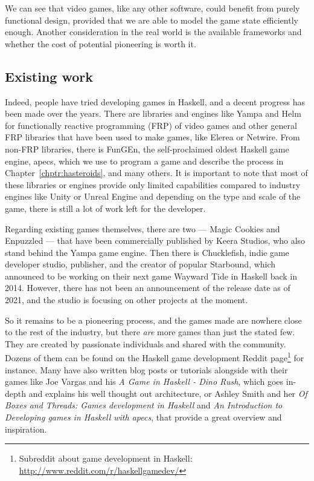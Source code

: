 \documentclass[
  digital, %
  color,   %
  table,   %
  oneside, %
  lof,     %
  lot,     %
]{fithesis3}
\begin{document}
We can see that video games, like any other software, could benefit from
purely functional design, provided that we are able to model the
game state efficiently enough. Another consideration in the real world
is the available frameworks and whether the cost of potential
pioneering is worth it.


\subsection{Existing work}
\label{sect:existing}
Indeed, people have tried developing games in Haskell, and a decent
progress has been made over the years. There are libraries and engines like Yampa\cite{yamparepo}
and Helm\cite{helmrepo} for functionally reactive programming (FRP) of video games and
other general FRP libraries that have been used to make games, like Elerea\cite{elerearepo}
or Netwire\cite{netwirerepo}. From non-FRP libraries, there is
FunGEn\cite{fungenrepo}, the self-proclaimed oldest Haskell game engine,
apecs\cite{apecsrepo}, which we use to program a game and describe the process
in Chapter~\ref{chptr:hasteroids}, and many others. It is important to note that
most of these libraries or engines provide only limited capabilities
compared to  industry engines like Unity or Unreal Engine
and depending on the type and scale of the game, there is still a lot
of work left for the developer.

Regarding existing games themselves, there are two --- Magic Cookies and
Enpuzzled --- that have been commercially published by Keera Studios,
who also stand behind the Yampa game engine\cite{keerastudios}.
Then there is Chucklefish, indie game developer studio, publisher, and
the creator of popular Starbound, which announced to be working on their next
game Wayward Tide in Haskell back in 2014\cite{waywardtide}. However, there
has not been an announcement of the release date as of 2021, and the studio is
focusing on other projects at the moment.

So it remains to be a pioneering process, and the games made are nowhere close
to the rest of the industry, but there \emph{are} more games than just the stated few.
They are created by passionate individuals and shared with the community. Dozens of them can be found
on the Haskell game development Reddit page\footnote{
Subreddit about game development in Haskell: \url{http://www.reddit.com/r/haskellgamedev/}
}
for instance. Many have also written blog posts or tutorials alongside with
their games like Joe Vargas and his \textit{A Game in Haskell - Dino Rush}\cite{dinorush},
which goes in-depth and explains his well thought out architecture,
or Ashley Smith and her \textit{Of Boxes and Threads: Games development in Haskell}\cite{aashaskell}
and \textit{An Introduction to Developing games in Haskell with apecs}\cite{aasapecs},
that provide a great overview and inspiration.
\end{document}
